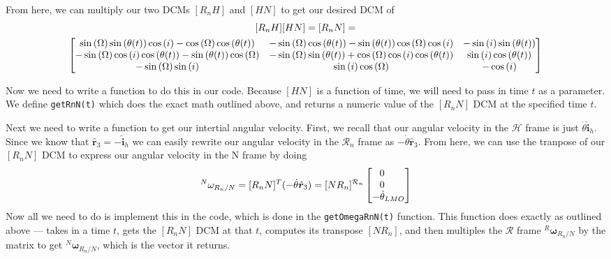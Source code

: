\documentclass[conf]{new-aiaa}
\begin{document}
From here, we can multiply our two DCMs $[R_nH]$ and $[HN]$ to get our desired DCM of 
 \begin{gather}
 \label{RnN}
 [R_nH][HN] = [R_nN] =  \notag \\
 \begin{bmatrix}\sin{\left(\Omega \right)} \sin{\left(\theta{\left(t \right)} \right)} \cos{\left(i \right)} - \cos{\left(\Omega \right)} \cos{\left(\theta{\left(t \right)} \right)} & - \sin{\left(\Omega \right)} \cos{\left(\theta{\left(t \right)} \right)} - \sin{\left(\theta{\left(t \right)} \right)} \cos{\left(\Omega \right)} \cos{\left(i \right)} & - \sin{\left(i \right)} \sin{\left(\theta{\left(t \right)} \right)}\\- \sin{\left(\Omega \right)} \cos{\left(i \right)} \cos{\left(\theta{\left(t \right)} \right)} - \sin{\left(\theta{\left(t \right)} \right)} \cos{\left(\Omega \right)} & - \sin{\left(\Omega \right)} \sin{\left(\theta{\left(t \right)} \right)} + \cos{\left(\Omega \right)} \cos{\left(i \right)} \cos{\left(\theta{\left(t \right)} \right)} & \sin{\left(i \right)} \cos{\left(\theta{\left(t \right)} \right)}\\- \sin{\left(\Omega \right)} \sin{\left(i \right)} & \sin{\left(i \right)} \cos{\left(\Omega \right)} & - \cos{\left(i \right)}
 \end{bmatrix}
 \end{gather}

Now we need to write a function to do this in our code. Because $[HN]$ is a function of time, we will need to pass in time $t$ as a parameter. We define \texttt{getRnN(t)} which does the exact math outlined above, and returns a numeric value of the $[R_nN]$ DCM at the specified time $t$.

Next we need to write a function to get our intertial angular velocity. First, we recall that our angular velocity in the $\mathcal{H}$ frame is just $\dot\theta\hat{\bm{i}}_h$. Since we know that $\hat{\bm{r}}_3 = -\hat{\bm{i}}_h$ we can easily rewrite our angular velocity in the $\mathcal{R}_n$ frame as $-\dot\theta\hat{\bm{r}}_3$. From here, we can use the tranpose of our $[R_nN]$ DCM to express our angular velocity in the N frame by doing
\begin{gather}
{}^N\omega_{R_n/N} = [R_nN]^T(-\dot\theta\hat{\bm{r}}_3) = [NR_n]{}^{\mathcal{R}_n}\begin{bmatrix}
\phantom{-}0\phantom{_{LMO}} \\ \phantom{-}0\phantom{_{LMO}} \\ -\dot\theta_{LMO}
\end{bmatrix} \notag 
\end{gather}
Now all we need to do is implement this in the code, which is done in the \texttt{getOmegaRnN(t)} function. This function does exactly as outlined above --- takes in a time $t$, gets the $[R_nN]$ DCM at that $t$, computes its transpose $[NR_n]$, and then multiples the $\mathcal{R}$ frame ${}^R\bm\omega_{R_n/N}$ by the matrix to get ${}^N\bm\omega_{R_n/N}$, which is the vector it returns. 
\end{document}
